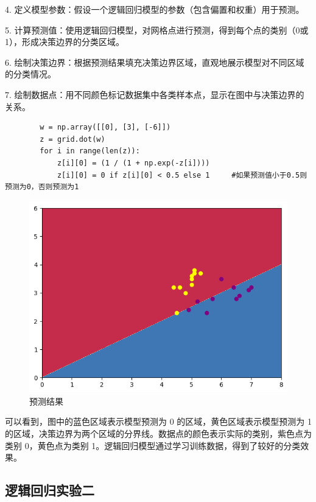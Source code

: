 \documentclass[12pt,a4paper,oneside]{article}
\begin{document}
    4.	定义模型参数：假设一个逻辑回归模型的参数（包含偏置和权重）用于预测。
	
    5.	计算预测值：使用逻辑回归模型，对网格点进行预测，得到每个点的类别（0或1），形成决策边界的分类区域。
	
    6.	绘制决策边界：根据预测结果填充决策边界区域，直观地展示模型对不同区域的分类情况。
	
    7.	绘制数据点：用不同颜色标记数据集中各类样本点，显示在图中与决策边界的关系。

    \begin{lstlisting}
        w = np.array([[0], [3], [-6]])
        z = grid.dot(w)
        for i in range(len(z)): 
            z[i][0] = (1 / (1 + np.exp(-z[i])))
            z[i][0] = 0 if z[i][0] < 0.5 else 1     #如果预测值小于0.5则预测为0，否则预测为1
    \end{lstlisting}

    \begin{figure}[H]
        \centering
        \begin{minipage}{0.4\textwidth}
            \centering
            \includegraphics[width=\textwidth]{image/4} %
            \caption{预测结果}
            \label{fig:image4}
        \end{minipage}
    \end{figure}

    可以看到，图中的蓝色区域表示模型预测为 0 的区域，黄色区域表示模型预测为 1 的区域，决策边界为两个区域的分界线。数据点的颜色表示实际的类别，紫色点为类别 0，黄色点为类别 1。逻辑回归模型通过学习训练数据，得到了较好的分类效果。
\subsection{逻辑回归实验二}
\end{document}
